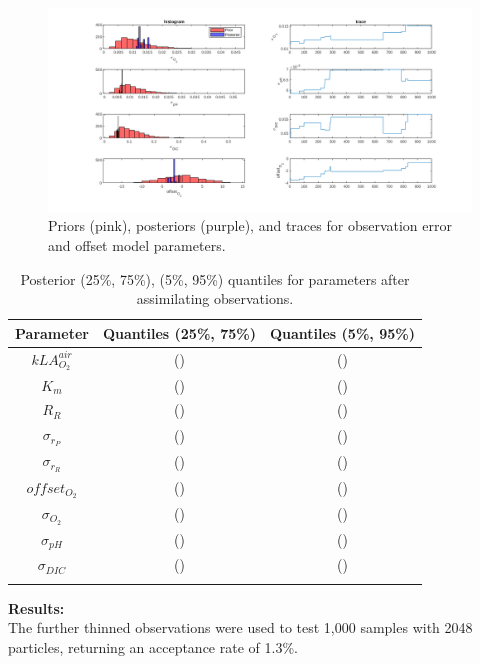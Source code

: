 \documentclass{ruthesis}
\begin{document}
\begin{figure}
	\centerline{\includegraphics[width=1.3\textwidth]{images_microalgae/plots_chris_offset_sigma/sigmas}}
	\caption[.]{Priors (pink), posteriors (purple), and traces for observation error and offset model parameters.}
	\label{fig:micro_exp_offset_sigma_sigmas}
\end{figure}



\begin{longtable}{|c|c|c|} 
	\hline
	\bfseries{Parameter}  & \bfseries{Quantiles (25\%, 75\%)}  & \bfseries{Quantiles (5\%, 95\%)} \\ \hline
	$kLA_{O_2}^{air}$ 	& ()  		& ()   		\\
	$K_m$ 				& () 		& () 	 	\\ 
	$R_R$ 				& () 		& () 		 \\
	$\sigma_{r_P}$ 		& () 		& () 		 \\ 
	$\sigma_{r_R}$ 		& () 		& ()		 \\ 
	$offset_{O_2}$ 		& () 		& ()		 \\ 
	$\sigma_{O_2}$ 		& () 		& ()		 \\ 
	$\sigma_{pH}$ 		& () 		& ()		 \\ 
	$\sigma_{DIC}$ 		& () 		& ()		 \\ 	
	\hline
	\caption[.]{Posterior (25\%, 75\%), (5\%, 95\%) quantiles for parameters after assimilating observations.}	
	\label{table:micro_exp_offset_sigma_parameters_table}
\end{longtable}

\textbf{Results:}\\
The further thinned observations were used to test 1,000 samples with 2048 particles, returning an acceptance rate of 1.3\%.



{}


%
%
\end{document}

